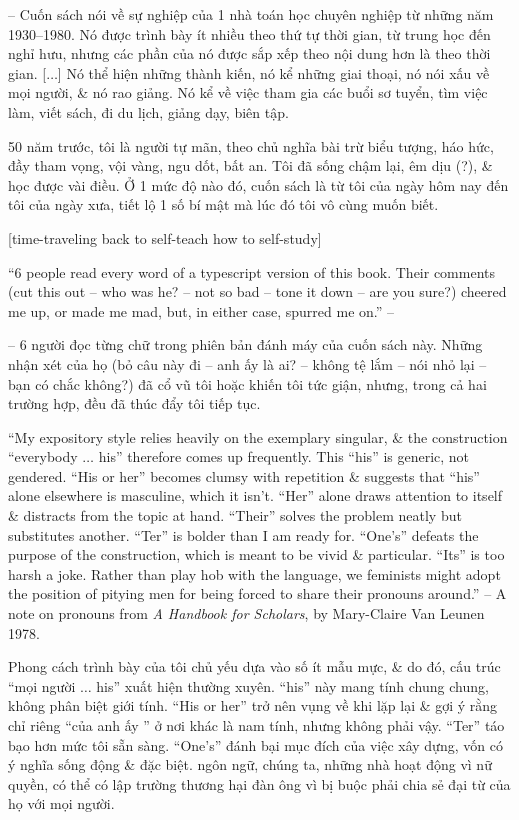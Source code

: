 \documentclass{article}
\begin{document}
\begin{enumerate}
	-- Cuốn sách nói về sự nghiệp của 1 nhà toán học chuyên nghiệp từ những năm 1930--1980. Nó được trình bày ít nhiều theo thứ tự thời gian, từ trung học đến nghỉ hưu, nhưng các phần của nó được sắp xếp theo nội dung hơn là theo thời gian. [$\ldots$] Nó thể hiện những thành kiến, nó kể những giai thoại, nó nói xấu về mọi người, \& nó rao giảng. Nó kể về việc tham gia các buổi sơ tuyển, tìm việc làm, viết sách, đi du lịch, giảng dạy, biên tập.

	50 năm trước, tôi là người tự mãn, theo chủ nghĩa bài trừ biểu tượng, háo hức, đầy tham vọng, vội vàng, ngu dốt, bất an. Tôi đã sống chậm lại, êm dịu (?), \& học được vài điều. Ở 1 mức độ nào đó, cuốn sách là từ tôi của ngày hôm nay đến tôi của ngày xưa, tiết lộ 1 số bí mật mà lúc đó tôi vô cùng muốn biết.

	[time-traveling back to self-teach how to self-study]

	``6 people read every word of a typescript version of this book. Their comments (cut this out -- who was he? -- not so bad -- tone it down -- are you sure?) cheered me up, or made me mad, but, in either case, spurred me on.'' -- \cite[Thanks]{Halmos1985}

	-- 6 người đọc từng chữ trong phiên bản đánh máy của cuốn sách này. Những nhận xét của họ (bỏ câu này đi -- anh ấy là ai? -- không tệ lắm -- nói nhỏ lại -- bạn có chắc không?) đã cổ vũ tôi hoặc khiến tôi tức giận, nhưng, trong cả hai trường hợp, đều đã thúc đẩy tôi tiếp tục.

	``My expository style relies heavily on the exemplary singular, \& the construction ``everybody $\ldots$ his'' therefore comes up frequently. This ``his'' is	generic, not gendered. ``His or her'' becomes clumsy with repetition \& suggests that ``his'' alone elsewhere is masculine, which it isn't. ``Her'' alone draws attention to itself \& distracts from the topic at hand. ``Their'' solves the problem neatly but substitutes another. ``Ter'' is bolder than I am ready for. ``One's'' defeats the purpose of the construction, which is meant to be vivid \& particular. ``Its'' is too harsh a joke. Rather than play hob with the language, we feminists might adopt the position of pitying men for being forced to share their pronouns around.'' -- A note on pronouns from {\it A Handbook for Scholars}, by {\sc Mary-Claire Van Leunen} 1978.

	Phong cách trình bày của tôi chủ yếu dựa vào số ít mẫu mực, \& do đó, cấu trúc ``mọi người $\ldots$ his'' xuất hiện thường xuyên. ``his'' này mang tính chung chung, không phân biệt giới tính. ``His or her'' trở nên vụng về khi lặp lại \& gợi ý rằng chỉ riêng ``của anh ấy '' ở nơi khác là nam tính, nhưng không phải vậy. ``Ter'' táo bạo hơn mức tôi sẵn sàng. ``One's'' đánh bại mục đích của việc xây dựng, vốn có ý nghĩa sống động \& đặc biệt. ngôn ngữ, chúng ta, những nhà hoạt động vì nữ quyền, có thể có lập trường thương hại đàn ông vì bị buộc phải chia sẻ đại từ của họ với mọi người.


\end{enumerate}
\end{document}
